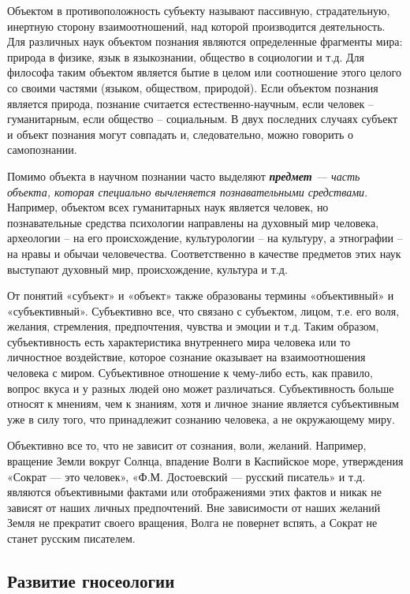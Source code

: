 \documentclass[a4paper, 14pt]{extreport}
\begin{document}
Объектом в противоположность субъекту называют пассивную, страдательную,
инертную сторону взаимоотношений, над которой производится деятельность.
Для различных наук объектом познания являются определенные фрагменты
мира: природа в физике, язык в языкознании, общество в социологии и т.д.
Для философа таким объектом является бытие в целом или соотношение этого
целого со своими частями (языком, обществом, природой). Если объектом
познания является природа, познание считается естественно-научным, если
человек -- гуманитарным, если общество -- социальным. В двух последних
случаях субъект и объект познания могут совпадать и, следовательно,
можно говорить о самопознании.

Помимо объекта в научном познании часто выделяют \emph{\textbf{предмет}
--- часть объекта, которая специально вычленяется познавательными
средствами}. Например, объектом всех гуманитарных наук является человек,
но познавательные средства психологии направлены на духовный мир
человека, археологии -- на его происхождение, культурологии -- на
культуру, а этнографии -- на нравы и обычаи человечества. Соответственно
в качестве предметов этих наук выступают духовный мир, происхождение,
культура и т.д.

От понятий «субъект» и «объект» также образованы термины «объективный» и
«субъективный». Субъективно все, что связано с субъектом, лицом, т.е.
его воля, желания, стремления, предпочтения, чувства и эмоции и т.д.
Таким образом, субъективность есть характеристика внутреннего мира
человека или то личностное воздействие, которое сознание оказывает на
взаимоотношения человека с миром. Субъективное отношение к чему-либо
есть, как правило, вопрос вкуса и у разных людей оно может различаться.
Субъективность больше относят к мнениям, чем к знаниям, хотя и личное
знание является субъективным уже в силу того, что принадлежит сознанию
человека, а не окружающему миру.

Объективно все то, что не зависит от сознания, воли, желаний. Например,
вращение Земли вокруг Солнца, впадение Волги в Каспийское море,
утверждения «Сократ --- это человек», «Ф.М. Достоевский --- русский
писатель» и т.д. являются объективными фактами или отображениями этих
фактов и никак не зависят от наших личных предпочтений. Вне зависимости
от наших желаний Земля не прекратит своего вращения, Волга не повернет
вспять, а Сократ не станет русским писателем.

\subsection{Развитие гносеологии}
\end{document}
